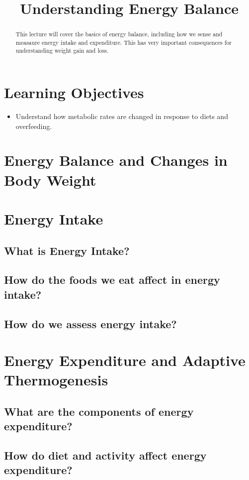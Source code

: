 \documentclass{tufte-handout}
\title{Understanding Energy Balance}
\author{}
\date{}  %
\begin{document}
\maketitle%

\begin{abstract}
\noindent This lecture will cover the basics of energy balance, including how we sense and measaure energy intake and expenditure.  This has very important consequences for understanding weight gain and loss.
\end{abstract}

\tableofcontents

\pagebreak
\section{Learning Objectives}

\begin{itemize}
\item Understand how metabolic rates are changed in response to diets and overfeeding.

\end{itemize}


\section{Energy Balance and Changes in Body Weight}

\section{Energy Intake}
\subsection{What is Energy Intake?}
\subsection{How do the foods we eat affect in energy intake?}
\subsection{How do we assess energy intake?}
\section{Energy Expenditure and Adaptive Thermogenesis}
\subsection{What are the components of energy expenditure?}
\subsection{How do diet and activity affect energy expenditure?}




\end{document}
